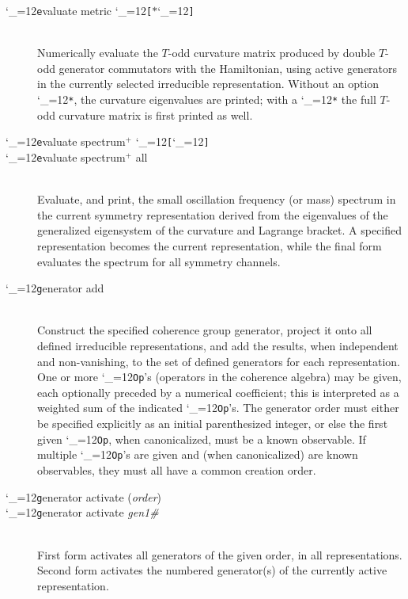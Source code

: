 \documentclass [12pt]{article}
\makeatletter
\renewcommand{\tt}{\begingroup\catcode`_=12\def\_{\string_}\tt@}
\newcommand{\tt@}[1]{\texttt{#1}\endgroup}
\makeatother
\begin{document}
\begin{description}
\item [\tt evaluate metric \tt{[}$*$\tt{]}]~\\
    Numerically evaluate the $T$-odd curvature matrix
    produced by double $T$-odd generator commutators with the 
    Hamiltonian,
    using active generators in the
    currently selected irreducible representation.
    Without an option \tt{*}, the curvature eigenvalues are printed;
    with a \tt{*} the full $T$-odd curvature matrix is first printed as well.

\item [\tt evaluate spectrum$^+$ \tt{[}{\it repname}\tt{]}] \bgroup\itemsep 0pt \parskip 0pt
\item [\tt evaluate spectrum$^+$ all]~\\
    Evaluate, and print, the
    small oscillation frequency (or mass) spectrum
    in the current symmetry representation
    derived from the eigenvalues of the generalized eigensystem
    of the curvature and Lagrange bracket.
    A specified representation becomes the current representation, while
    the final form evaluates the spectrum for all symmetry channels.
\egroup

\item [\tt generator add {\tt{[}}({\it order}){\tt{]}}
    {\tt{[}}{\it coeff}{\tt{]}} {\it op1}
    {\tt{[[}}{\it coeff}{\tt{]}} {\it op2}{\tt{]}} $\cdots$ ]~\\
    Construct the specified coherence group generator, 
    project it onto all defined irreducible representations,
    and add the results, when independent and non-vanishing, to the
    set of defined generators for each representation.
    One or more \tt{Op}'s (operators in the coherence algebra)
    may be given,
    each optionally preceded by a numerical coefficient;
    this is interpreted as a weighted sum of the indicated \tt{Op}'s.
    The generator order must either be specified explicitly
    as an initial parenthesized integer,
    or else the first given \tt{Op}, when canonicalized,
    must be a known observable.
    If multiple \tt{Op}'s are given and (when canonicalized)
    are known observables, they must all have a common creation order.

\item [\tt generator activate ({\it order})] \bgroup\itemsep 0pt \parskip 0pt
\item [\tt generator activate {\it{gen1\#}} {\tt{[}}{\it gen2\#}{\tt{]}} $\cdots$ ]~\\
    First form activates all generators of the given order, in all representations.
    Second form activates the numbered generator(s) of the currently active representation.
\egroup


\end{description}
\end{document}

